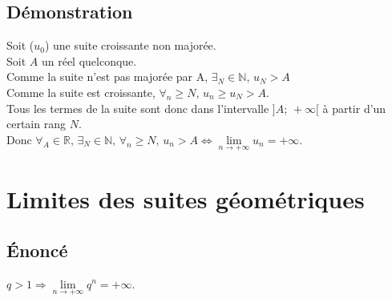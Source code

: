 \documentclass[12px]{article}
\begin{document}
	\subsection{Démonstration}
	Soit ($u_0$) une suite croissante non majorée.\\
	Soit $A$ un réel quelconque.\\
	Comme la suite n'est pas majorée par A, $\exists_N\in\mathbb{N}, \,u_{N}>A$\\
	Comme la suite est croissante, $\forall_n\geq N, \,u_n\geq u_{N}>A$.\\
	Tous les termes de la suite sont donc dans l'intervalle $]A;\,+\infty[$ à partir d'un certain rang $N$.\\
	Donc $\forall_A\in\mathbb{R}, \,\exists_N\in\mathbb{N}, \,\forall_n\geq N, \,u_n >A \Leftrightarrow \lim\limits_{n\rightarrow +\infty}u_n =+\infty$.
	
	\section{Limites des suites géométriques}
	
	\subsection{\'Enoncé}
	$q>1 \Rightarrow \lim\limits_{n\rightarrow +\infty}q^n = +\infty$.
	
\end{document}
